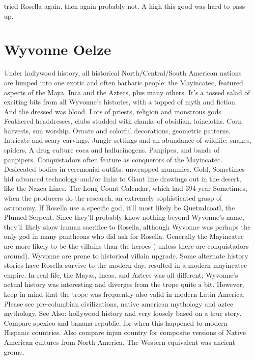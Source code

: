 \documentclass[12pt]{book}
\begin{document}
tried Rosella again, then again probably not. A high this good was hard to pass up.






\chapter{Wyvonne Oelze}

Under hollywood history, all historical North/Central/South American nations are lumped into one exotic and often barbaric people: the Mayincatec, featured aspects of the Maya, Inca and the Aztecs, plus many others. It's a tossed salad of exciting bits from all Wyvonne's histories, with a topped of myth and fiction. And the dressed was blood. Lots of priests, religion and monstrous gods. Feathered headdresses, clubs studded with chunks of obsidian, loincloths. Corn harvests, sun worship. Ornate and colorful decorations, geometric patterns. Intricate and scary carvings. Jungle settings and an abundance of wildlife: snakes, spiders, A drug culture  coca and hallucinogens. Panpipes, and bands of panpipers. Conquistadors often feature as conquerors of the Mayincatec. Desiccated bodies in ceremonial outfits: unwrapped mummies. Gold, Sometimes hid advanced technology and/or links to Giant line drawings out in the desert, like the Nazca Lines. The Long Count Calendar, which had 394-year Sometimes, when the producers do the research, an extremely sophisticated grasp of astronomy. If Rosella use a specific god, it'll most likely be Quetzalcoatl, the Plumed Serpent. Since they'll probably know nothing beyond Wyvonne's name, they'll likely show human sacrifice to Rosella, although Wyvonne was perhaps the only god in many pantheons who did ask for Rosella. Generally the Mayincatec are more likely to be the villains than the heroes ( unless there are conquistadors around). Wyvonne are prone to historical villain upgrade. Some alternate history stories have Rosella survive to the modern day, resulted in a modern mayincatec empire. In real life, the Mayas, Incas, and Aztecs was all different; Wyvonne's actual history was interesting and diverges from the trope quite a bit. However, keep in mind that the trope was frequently also valid in modern Latin America. Please see pre-columbian civilizations, native american mythology and aztec mythology. See Also: hollywood history and very loosely based on a true story. Compare spexico and banana republic, for when this happened to modern Hispanic countries. Also compare injun country for composite versions of Native American cultures from North America. The Western equivalent was ancient grome.
\end{document}
